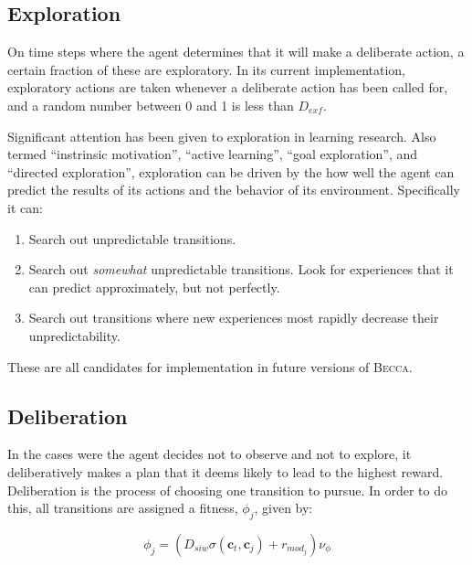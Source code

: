\subsection{Exploration}
On time steps where the agent determines that it will make a deliberate action, a certain fraction of these are exploratory. In its current implementation, exploratory actions are taken whenever a deliberate action has been called for, and a random number between 0 and 1 is less than $D_{exf}$. 

Significant attention has been given to exploration in learning research. Also termed ``instrinsic motivation'', ``active learning'', ``goal exploration'', and ``directed exploration'',  exploration can be driven by the how well the agent can predict the results of its actions and the behavior of its environment. Specifically it can:

\begin{enumerate}
\item Search out unpredictable transitions.
\item Search out {\em somewhat} unpredictable transitions. Look for experiences that it can  predict approximately, but not perfectly.
\item Search out transitions where new experiences most rapidly decrease their unpredictability.
\end{enumerate}

These are all candidates for implementation in future versions of \textsc{Becca}.


\subsection{Deliberation}
In the cases were the agent decides not to observe and not to explore, it deliberatively makes a plan that it deems likely to lead to the highest reward. Deliberation is the process of choosing one transition to pursue. In order to do this, all transitions are assigned a fitness, $\phi_j$, given by:

\begin{equation}
\phi_j = (D_{siw} \sigma(\mathbf{c}_t,\mathbf{c}_j) +  r_{mod_j}) \nu_\phi
\end{equation}

